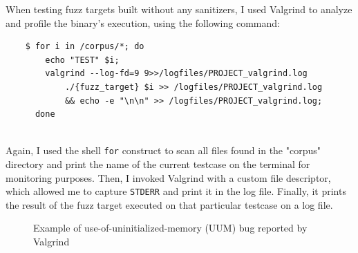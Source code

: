 \newpage
When testing fuzz targets built without any sanitizers, I used Valgrind to analyze and profile the binary's execution, using the following command:
\begin{verbatim}
    $ for i in /corpus/*; do 
        echo "TEST" $i; 
        valgrind --log-fd=9 9>>/logfiles/PROJECT_valgrind.log 
            ./{fuzz_target} $i >> /logfiles/PROJECT_valgrind.log 
            && echo -e "\n\n" >> /logfiles/PROJECT_valgrind.log; 
      done
\end{verbatim}
\ \\
Again, I used the shell \verb|for| construct to scan all files found in the "corpus" directory and print the name of the current testcase on the terminal for monitoring purposes.
\newline
Then, I invoked Valgrind with a custom file descriptor, which allowed me to capture \verb|STDERR| and print it in the log file.
\newline
Finally, it prints the result of the fuzz target executed on that particular testcase on a log file.
\newline
\begin{figure}[h]
\caption{Example of use-of-uninitialized-memory (UUM) bug reported by Valgrind}
\label{fig:valgrind_example}
\end{figure}
\ \\




